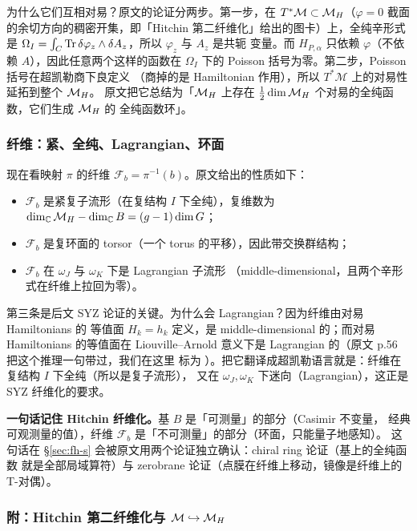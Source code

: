 为什么它们互相对易？原文的论证分两步。第一步，在 $T^*\mathcal M\subset\mathcal{M}_H$（$\varphi=0$
截面的余切方向的稠密开集，即「Hitchin 第二纤维化」给出的图卡）上，全纯辛形式是
$\Omega_I=\int_C\operatorname{Tr}\delta\varphi_z\wedge\delta A_z$，所以 $\varphi_z$ 与 $A_z$ 是共轭
变量。而 $H_{P,\alpha}$ 只依赖 $\varphi$（不依赖 $A$），因此任意两个这样的函数在
$\Omega_I$ 下的 Poisson 括号为零。第二步，Poisson 括号在超凯勒商下良定义
（商掉的是 Hamiltonian 作用），所以 $T^*\mathcal M$ 上的对易性延拓到整个 $\mathcal{M}_H$。
原文把它总结为「$\mathcal{M}_H$ 上存在 $\tfrac12\dim\mathcal{M}_H$ 个对易的全纯函数，它们生成 $\mathcal{M}_H$ 的
全纯函数环」。\pB{}

\subsubsection*{纤维：紧、全纯、Lagrangian、环面}

现在看映射 $\pi$ 的纤维 $\mathcal F_b=\pi^{-1}(b)$。原文给出的性质如下：\pA{}
\begin{itemize}
\item $\mathcal F_b$ 是紧复子流形（在复结构 $I$ 下全纯），复维数为
  $\dim_{\mathbb{C}}\mathcal{M}_H-\dim_{\mathbb{C}} B=(g-1)\dim G$；
\item $\mathcal F_b$ 是复环面的 torsor（一个 torus 的平移），因此带交换群结构；
\item $\mathcal F_b$ 在 $\omega_J$ 与 $\omega_K$ 下是 Lagrangian 子流形
  （middle-dimensional，且两个辛形式在纤维上拉回为零）。
\end{itemize}
第三条是后文 SYZ 论证的关键。为什么会 Lagrangian？因为纤维由对易 Hamiltonians 的
等值面 $H_k=h_k$ 定义，是 middle-dimensional 的；而对易 Hamiltonians 的等值面在
Liouville--Arnold 意义下是 Lagrangian 的（原文 p.56 把这个推理一句带过，我们在这里
标为 \pB）。把它翻译成超凯勒语言就是：纤维在复结构 $I$ 下全纯（所以是复子流形），
又在 $\omega_J,\omega_K$ 下迷向（Lagrangian），这正是 SYZ 纤维化的要求。
\pB{}

\begin{keyidea}
\textbf{一句话记住 Hitchin 纤维化。}基 $B$ 是「可测量」的部分（Casimir 不变量，
经典可观测量的值），纤维 $\mathcal F_b$ 是「不可测量」的部分（环面，只能量子地感知）。
这句话在 §\ref{sec:fh-s} 会被原文用两个论证独立确认：chiral ring 论证（基上的全纯函数
就是全部局域算符）与 zerobrane 论证（点膜在纤维上移动，镜像是纤维上的 T-对偶）。
\end{keyidea}

\subsubsection*{附：Hitchin 第二纤维化与 $\mathcal M\hookrightarrow\mathcal{M}_H$}

